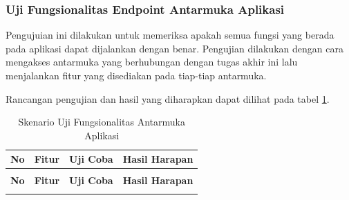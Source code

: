         \subsubsection{Uji Fungsionalitas Endpoint Antarmuka Aplikasi} \label{ujimengelolaaplikasiberbasisdocker}
        	Pengujuian ini dilakukan untuk memeriksa apakah semua fungsi yang berada pada aplikasi dapat dijalankan dengan benar. Pengujian dilakukan dengan cara mengakses antarmuka yang berhubungan dengan tugas akhir ini lalu menjalankan fitur yang disediakan pada tiap-tiap antarmuka.
        	
        	Rancangan pengujian dan hasil yang diharapkan dapat dilihat pada tabel \ref{ujiaplikasi}.
        	
            \begin{longtable}{|p{}|p{}|p{}|p{}|}					\caption{Skenario Uji Fungsionalitas Antarmuka Aplikasi} \label{ujiaplikasi} \\
					\hline
					\textbf{No} & \textbf{Fitur} & \textbf{Uji Coba} & \textbf{Hasil Harapan} \\ \hline
					\endfirsthead
					\caption[]{Skenario Uji Fungsionalitas Antarmuka Aplikasi} \\
					\hline
					\textbf{No} & \textbf{Fitur} & \textbf{Uji Coba} & \textbf{Hasil Harapan} \\ \hline
					\endhead
					\endfoot
					\endlastfoot
					

\end{longtable}
